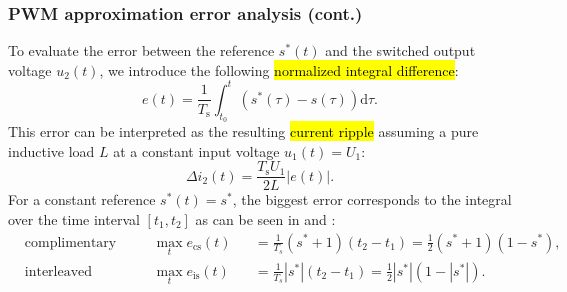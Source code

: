 \begin{frame}
    \frametitle{PWM approximation error analysis (cont.)} 
    To evaluate the error between the reference $s^*(t)$ and the switched output voltage $u_2(t)$, we introduce the following \hl{normalized integral difference}:
    \begin{equation}
        e(t) = \frac{1}{T_\mathrm{s}}\int_{t_0}^{t}\left(s^*(\tau)-s(\tau)\right)\mathrm{d}\tau.
    \end{equation}\pause
    This error can be interpreted as the resulting \hl{current ripple} assuming a pure inductive load $L$ at a constant input voltage $u_1(t)=U_1$:
    \begin{equation}
        \Delta i_2(t) = \frac{T_\mathrm{s}U_1}{2 L } \left|e(t)\right|.
        \label{eq:current_ripple_PWM_single_phase_ACDC}
    \end{equation}\pause
    For a constant reference $s^*(t)=s^*$, the biggest error corresponds to the integral over the time interval $[t_1, t_2]$ as can be seen in  and :
    \begin{equation}
        \begin{alignedat}{3}
        &\mbox{complimentary switching (cs):}\quad &&\max_t e_{\mathrm{cs}}(t) &&= \frac{1}{T_s}\left(s^* + 1\right)\left(t_2-t_1\right) = \frac{1}{2}\left(s^* + 1\right)\left(1-s^*\right),\\
        &\mbox{interleaved switching (is):}\quad &&\max_t e_{\mathrm{is}}(t) &&= \frac{1}{T_s}\left|s^*\right|\left(t_2-t_1\right) = \frac{1}{2}\left|s^*\right|\left(1-\left|s^*\right|\right).
        \end{alignedat}
        \label{eq:max_errors_comp_int_PWM_signle_phase}
    \end{equation}
\end{frame}


